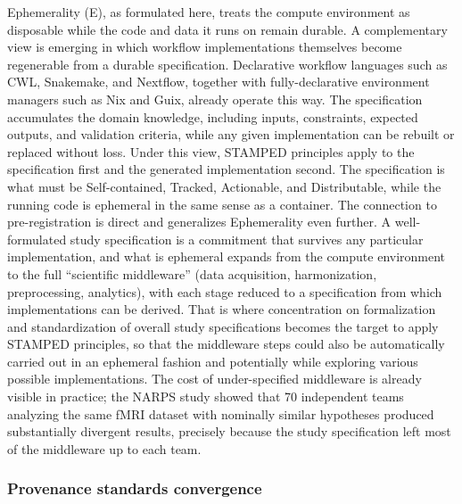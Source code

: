 \documentclass{article}
\makeatletter
\newcommand{\hyanchor}[1]{\texorpdfstring{\Hy@raisedlink{\hypertarget{#1}{}}}{}}
\newcommand{\anchoredsubsubsection}[2]{\subsubsection[#2]{\hyanchor{#1}#2}}
\makeatother
\begin{document}
Ephemerality (E), as formulated here, treats the compute environment as disposable while the code and data it runs on remain durable.
A complementary view is emerging in which workflow implementations themselves become regenerable from a durable specification.
Declarative workflow languages such as CWL\cite{crusoe_methods_2022}, Snakemake\cite{molder_sustainable_2021}, and Nextflow\cite{di_tommaso_nextflow_2017}, together with fully-declarative environment managers such as Nix and Guix, already operate this way.
The specification accumulates the domain knowledge, including inputs, constraints, expected outputs, and validation criteria, while any given implementation can be rebuilt or replaced without loss.
Under this view, STAMPED principles apply to the specification first and the generated implementation second.
The specification is what must be Self-contained, Tracked, Actionable, and Distributable, while the running code is ephemeral in the same sense as a container.
The connection to pre-registration is direct and generalizes Ephemerality even further\cite{nosek_preregistration_2018}.
A well-formulated study specification is a commitment that survives any particular implementation, and what is ephemeral expands from the compute environment to the full ``scientific middleware'' (data acquisition, harmonization, preprocessing, analytics), with each stage reduced to a specification from which implementations can be derived.
That is where concentration on formalization and standardization of overall study specifications becomes the target to apply STAMPED principles, so that the middleware steps could also be automatically carried out in an ephemeral fashion and potentially while exploring various possible implementations.
The cost of under-specified middleware is already visible in practice; the NARPS study showed that 70 independent teams analyzing the same fMRI dataset with nominally similar hypotheses produced substantially divergent results\cite{botvinik-nezer_variability_2020}, precisely because the study specification left most of the middleware up to each team.


\anchoredsubsubsection{provenance-standards}{Provenance standards convergence}
\end{document}
